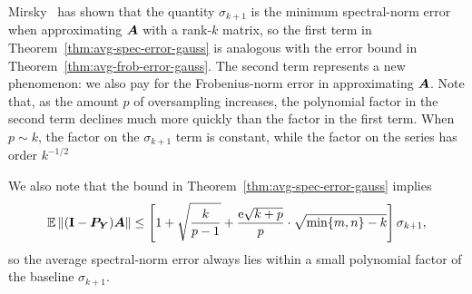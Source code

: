 \documentclass[final]{siamltex}
\newcommand{\notate}[1]{\textcolor{red}{\textbf{[#1]}}}
\begin{document}

Mirsky~\cite{Mir60:Symmetric-Gauge} has shown that the quantity
$\sigma_{k+1}$ is the minimum spectral-norm error when
approximating $\bm{A}$ with a rank-$k$ matrix, so
the first term in Theorem~\ref{thm:avg-spec-error-gauss} is analogous
with the error bound in Theorem~\ref{thm:avg-frob-error-gauss}.  The
second term represents a new phenomenon: we also pay for
the Frobenius-norm error in approximating $\bm{A}$.
Note that, as the amount $p$ of oversampling increases, the
polynomial factor in the second term declines much more quickly
than the factor in the first term.  When $p \sim k$, the factor on the $\sigma_{k+1}$ term is constant, while the factor on the series has order $k^{-1/2}$

We also note that the bound in Theorem~\ref{thm:avg-spec-error-gauss}
implies
$$
\operatorname{\mathbb{E}} \left\Vert {(\mathbf{I}- \bm{P}_{\bm{Y}}) \bm{A}} \right\Vert
    \leq \left[ 1 + \sqrt{\frac{k}{p-1}}  + \frac{\mathrm{e}\sqrt{k+p}}{p} \cdot \sqrt{\min\{m,n\} - k} \right]
        \sigma_{k+1},
$$
so the average spectral-norm error always lies within a small
polynomial factor of the baseline $\sigma_{k+1}$.

%
%
%
%
%
\end{document}
